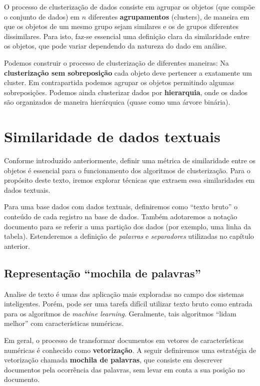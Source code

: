  O processo de clusterização de dados consiste em agrupar os objetos (que compõe o conjunto de dados) em $n$ diferentes \textbf{agrupamentos} (clusters), de maneira em que os objetos de um mesmo grupo sejam similares e os de grupos diferentes dissimilares.
 Para isto, faz-se essencial uma definição clara da similaridade entre os objetos, que pode variar dependendo da natureza do dado em análise.
 
 Podemos construir o processo de clusterização de diferentes maneiras: Na \textbf{clusterização sem sobreposição} cada objeto deve pertencer a exatamente um cluster. 
 Em contrapartida podemos agrupar os objetos permitindo algumas sobreposições. Podemos ainda clusterizar dados por \textbf{hierarquia}, onde os dados são organizados de maneira hierárquica (quase como uma árvore binária).
 
 \pagebreak
 
 \section{Similaridade de dados textuais}
 Conforme introduzido anteriormente, definir uma métrica de similaridade entre os objetos é essencial para o funcionamento dos algoritmos de clusterização.
 Para o propósito deste texto, iremos explorar técnicas que extraem essa similaridades em dados textuais.
 
 Para uma base dados com dados textuais, definiremos como ``texto bruto'' o conteúdo de cada registro na base de dados. 
 Também adotaremos a notação documento para se referir a uma partição dos dados (por exemplo, uma linha da tabela).
 Estenderemos a definição de \emph{palavras} e \emph{separadores} utilizadas no capítulo anterior.
 
 \subsection{Representação ``mochila de palavras''}
 Analise de texto é umas das aplicação mais exploradas no campo dos sistemas inteligentes.
Porém, pode ser uma tarefa difícil utilizar texto bruto como entrada para os algoritmos de \emph{machine learning}. Geralmente, tais algoritmos ``lidam melhor'' com características numéricas.
 
 Em geral, o processo de transformar documentos em vetores de características numéricas é conhecido como \textbf{vetorização}. 
 A seguir definiremos uma estratégia de vetorização chamada \textbf{mochila de palavras}, que consiste em descrever documentos pela ocorrência das palavras, sem levar em conta a sua posição no documento.
  
